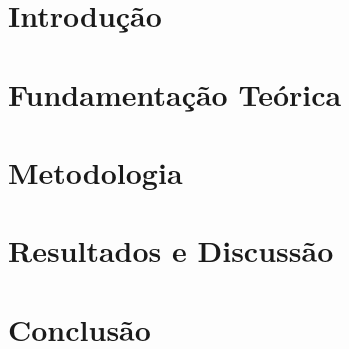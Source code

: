 \documentclass[openany,oneside,a4paper,10pt]{extarticle}
\begin{document}
\endgroup

\section{Introdução}
\onehalfspacing



\section{Fundamentação Teórica}
\onehalfspacing


\section{Metodologia}
\onehalfspacing


\section{Resultados e Discussão}
\onehalfspacing


\section{Conclusão}
\onehalfspacing
 

\printbibliography

% 
\end{document}
